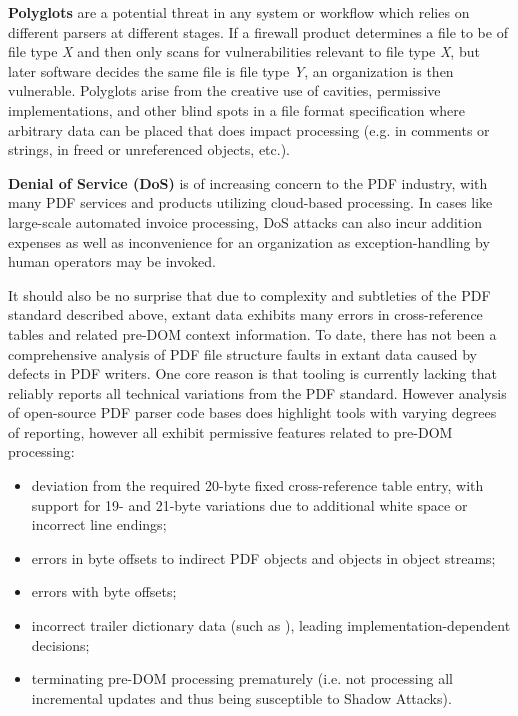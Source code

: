 {\bf{Polyglots}} are a potential threat in any system or workflow which relies on different parsers
at different stages. If a firewall product determines a file to be of file type \emph{X} and then only 
scans for vulnerabilities relevant to file type \emph{X}, but later software decides the same file 
is file type \emph{Y}, an organization is then vulnerable. Polyglots arise from the creative use of
cavities, permissive implementations, 
and other blind spots in a file format specification where arbitrary data can be placed 
that does impact processing (e.g. in comments or strings, in freed or unreferenced objects, etc.).

{\bf{Denial of Service (DoS)}} is of increasing concern to the PDF industry, with many PDF services
and products utilizing cloud-based processing. In cases like large-scale automated invoice 
processing, DoS attacks can also incur addition expenses as well as inconvenience for an organization 
as exception-handling by human operators may be invoked.  

It should also be no surprise that due to complexity and subtleties of the PDF standard described above,
extant data exhibits many errors in cross-reference tables and related pre-DOM context information.
To date, there has not been a comprehensive analysis of PDF file structure faults in extant data
caused by defects in PDF writers. One core reason is that tooling is currently lacking that reliably reports
all technical variations from the PDF standard. However analysis of open-source PDF parser code bases
does highlight tools with varying degrees of reporting, however all exhibit permissive features related
to pre-DOM processing:

\begin{itemize}
    \item deviation from the required 20-byte fixed cross-reference table entry, with support for
    19- and 21-byte variations due to additional white space or incorrect line endings;
    \item errors in byte offsets to indirect PDF objects and objects in object streams;
    \item errors with  byte offsets;
    \item incorrect trailer dictionary data (such as ), leading implementation-dependent decisions;  
    \item terminating pre-DOM processing prematurely (i.e. not processing all incremental updates and thus 
    being susceptible to Shadow Attacks).
\end{itemize}
